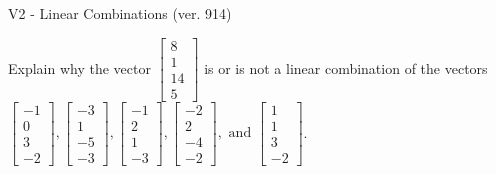 \begin{exercise}
  \begin{exerciseTitle}V2 - Linear Combinations (ver. 914)\end{exerciseTitle}
  \begin{exerciseStatement}
    Explain why the vector \(\left[\begin{array}{c}
8 \\
1 \\
14 \\
5
\end{array}\right]\)  is or is not a linear 
	combination of the vectors \(\left[\begin{array}{c}
-1 \\
0 \\
3 \\
-2
\end{array}\right] , \left[\begin{array}{c}
-3 \\
1 \\
-5 \\
-3
\end{array}\right] , \left[\begin{array}{c}
-1 \\
2 \\
1 \\
-3
\end{array}\right] , \left[\begin{array}{c}
-2 \\
2 \\
-4 \\
-2
\end{array}\right] , \text{ and } \left[\begin{array}{c}
1 \\
1 \\
3 \\
-2
\end{array}\right]\).
	



\end{exerciseStatement}
\end{exercise}
